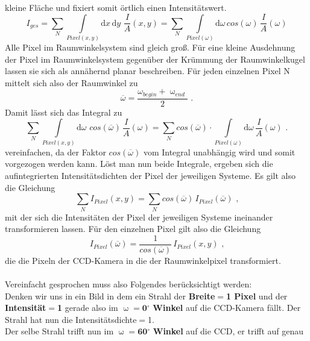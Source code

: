 kleine Fläche und fixiert somit örtlich einen Intensitätswert. \begin{equation}
I_{ges}= \sum_N \int \limits_{Pixel(x,y) } \! \mathrm{d}x \, \mathrm{d}y \,\,
\frac{I}{A}(x,y) = \sum_N \int \limits_{Pixel(\omega)} \! \mathrm{d}\omega \,
cos(\omega) \, \frac{I}{A}(\omega) \end{equation} Alle Pixel im Raumwinkelsystem
sind gleich groß. Für eine kleine Ausdehnung der Pixel im Raumwinkelsystem
gegenüber der Krümmung der Raumwinkelkugel lassen sie sich als annähernd planar
beschreiben. Für jeden einzelnen Pixel N mittelt sich also der Raumwinkel zu
\begin{equation} \overline{\omega} = \frac{\omega_{begin} + \upomega_{end}}{2}
\text{ .} \end{equation} Damit lässt sich das Integral zu \begin{equation}
\sum_N \int \limits_{Pixel(x,y)} \! \mathrm{d}\omega \,\, cos(\overline{\omega})
\, \frac{I}{A}(\omega) = \sum_N  cos(\overline{\omega})  \cdot \int
\limits_{Pixel(\omega)} \! \mathrm{d}\omega  \, \frac{I}{A}(\omega) \text{ .}
\end{equation} vereinfachen, da der Faktor $cos(\overline{\omega})$ vom Integral
unabhängig wird und somit vorgezogen werden kann. Löst man nun beide Integrale,
ergeben sich die aufintegrierten Intensitätsdichten der Pixel der jeweiligen
Systeme. Es gilt also die Gleichung \begin{equation} \sum_N I_{Pixel}(x,y) =
\sum_N cos(\overline{\omega}) \, I_{Pixel}(\overline{\omega})  \text{ ,}
\end{equation} mit der sich die Intensitäten der Pixel der jeweiligen Systeme
ineinander transformieren lassen. Für den einzelnen Pixel gilt also die
Gleichung \begin{equation} I_{Pixel}(\overline{\omega}) =
\frac{1}{cos(\overline{\omega})} \, I_{Pixel}(x,y) \text{ ,} \label{Korr2}
\end{equation} die die Pixeln der CCD-Kamera in die der Raumwinkelpixel
transformiert.\\ \\ Vereinfacht gesprochen muss also Folgendes berücksichtigt
werden:\\ Denken wir uns in ein Bild in dem ein Strahl der \textbf{Breite$=$1
Pixel} und der \textbf{Intensität$=$1} gerade also im
$\upomega=\textbf{0$^\circ$}$ \textbf{Winkel} auf die CCD-Kamera fällt. Der
Strahl hat nun die Intensitätsdichte$=$1.\\ Der selbe Strahl trifft nun im
$\upomega=\textbf{60$^\circ$}$ \textbf{Winkel} auf die CCD, er trifft  auf genau
